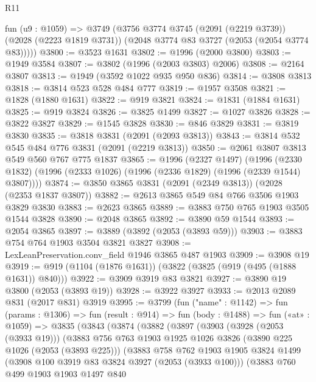 \begin{lexlean}{R11}
\begin{coremodule}
    fun (u9 : @1059) =>
    @3749
      (@3756
        @3774
        @3745
        (@2091 (@2219 @3739))
        (@2028 (@2223 @1819 @3731))
        (@2048 @3774 @83 @3727 (@2053 (@2054 @3774 @83)))))
@3800 := @3523 @1631
@3802 := @1996 (@2000 @3800)
@3803 := @1949 @3584
@3807 := @3802 (@1996 (@2003 @3803) @2006)
@3808 := @2164 @3807
@3813 := @1949 (@3592 @1022 @935 @950 @836)
@3814 := @3808 @3813
@3818 := @3814 @523 @528 @484 @777
@3819 := @1957 @3508
@3821 := @1828 (@1880 @1631)
@3822 := @919 @3821
@3824 := @1831 (@1884 @1631)
@3825 := @919 @3824
@3826 := @3825 @1499
@3827 := @1027 @3826
@3828 := @3822 @3827
@3829 := @1545 @3828
@3830 := @846 @3829
@3831 := @3819 @3830
@3835 := @3818 @3831 (@2091 (@2093 @3813))
@3843 := @3814 @532 @545 @484 @776 @3831 (@2091 (@2219 @3813))
@3850 := @2061 @3807 @3813 @549 @560 @767 @775 @1837
@3865 := @1996
    (@2327 @1497)
    (@1996 (@2330 @1832) (@1996 (@2333 @1026) (@1996 (@2336 @1829) (@1996 (@2339 @1544) @3807))))
@3874 := @3850 @3865 @3831 (@2091 (@2349 @3813)) (@2028 (@2353 @1837 @3807))
@3882 := @2613 @3865 @549 @84 @766 @3506 @1903 @3829 @3830
@3883 := @2623 @3865
@3889 := @3883 @750 @765 @1903 @3505 @1544 @3828
@3890 := @2048 @3865
@3892 := @3890 @59 @1544
@3893 := @2054 @3865
@3897 := @3889 (@3892 (@2053 (@3893 @59)))
@3903 := @3883 @754 @764 @1903 @3504 @3821 @3827
@3908 := LexLeanPreservation.conv_field @1946 @3865 @487 @1903
@3909 := @3908 @19
@3919 := @919 (@1104 (@1876 @1631)) (@3822 (@3825 (@919 (@495 (@1888 @1631)) @840)))
@3922 := @3909 @3919 @83 @3821
@3927 := @3890 @19 @3800 (@2053 (@3893 @19))
@3928 := @3922 @3927
@3933 := @2013 @2089 @831 (@2017 @831) @3919
@3995 := @3799
    (fun ("name" : @1142) =>
    fun (params : @1306) =>
    fun (result : @914) =>
    fun (body : @1488) =>
    fun («at» : @1059) =>
    @3835
      (@3843
        (@3874
          (@3882
            (@3897
              (@3903
                (@3928 (@2053 (@3933 @19)))
                (@3883
                  @756
                  @763
                  @1903
                  @1925
                  @1026
                  @3826
                  (@3890 @225 @1026 (@2053 (@3893 @225)))
                  (@3883
                    @758
                    @762
                    @1903
                    @1905
                    @3824
                    @1499
                    (@3908 @100 @3919 @83 @3824 @3927 (@2053 (@3933 @100)))
                    (@3883
                      @760
                      @499
                      @1903
                      @1903
                      @1497
                      @840

\end{coremodule}
\end{lexlean}
